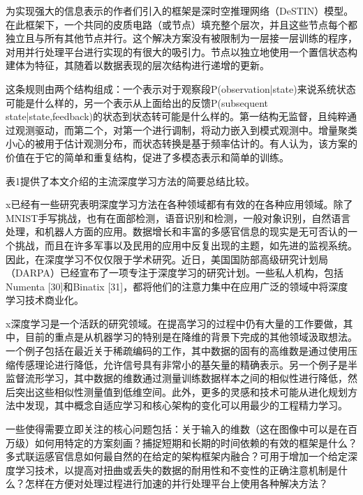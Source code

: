 为实现强大的信息表示的作者们引入的框架是深时空推理网络（DeSTIN）模型。在此框架下，一个共同的皮质电路（或节点）填充整个层次，并且这些节点每个都独立且与所有其他节点并行。这个解决方案没有被限制为一层接一层训练的程序，对用并行处理平台进行实现的有很大的吸引力。节点以独立地使用一个置信状态构建体为特征，其随着以数据表现的层次结构进行递增的更新。

这条规则由两个结构组成：一个表示对于观察段P(observation|state)来说系统状态可能是什么样的，另一个表示从上面给出的反馈P(subsequent state|state,feedback)的状态到状态转可能是什么样的。第一结构无监督，且纯粹通过观测驱动，而第二个，对第一个进行调制，将动力嵌入到模式观测中。增量聚类小心的被用于估计观测分布，而状态转换是基于频率估计的。有人认为，该方案的价值在于它的简单和重复结构，促进了多模态表示和简单的训练。

表1提供了本文介绍的主流深度学习方法的简要总结比较。

x已经有一些研究表明深度学习方法在各种领域都有有效的在各种应用领域。除了MNIST手写挑战，也有在面部检测，语音识别和检测，一般对象识别，自然语言处理，和机器人方面的应用。数据增长和丰富的多感官信息的现实是无可否认的一个挑战，而且在许多军事以及民用的应用中反复出现的主题，如先进的监视系统。因此，在深度学习不仅仅限于学术研究。近日，美国国防部高级研究计划局（DARPA）已经宣布了一项专注于深度学习的研究计划。一些私人机构，包括Numenta [30]和Binatix [31]，都将他们的注意力集中在应用广泛的领域中将深度学习技术商业化。

x深度学习是一个活跃的研究领域。在提高学习的过程中仍有大量的工作要做，其中，目前的重点是从机器学习的特别是在降维的背景下完成的其他领域汲取想法。一个例子包括在最近关于稀疏编码的工作，其中数据的固有的高维数是通过使用压缩传感理论进行降低，允许信号具有非常小的基矢量的精确表示。另一个例子是半监督流形学习，其中数据的维数通过测量训练数据样本之间的相似性进行降低，然后突出这些相似性测量值到低维空间。此外，更多的灵感和技术可能从进化规划方法中发现，其中概念自适应学习和核心架构的变化可以用最少的工程精力学习。

一些使得需要立即关注的核心问题包括：关于输入的维数（这在图像中可以是在百万级）如何用特定的方案刻画？捕捉短期和长期的时间依赖的有效的框架是什么？多式联运感官信息如何最自然的在给定的架构框架内融合？可用于增加一个给定深度学习技术，以提高对扭曲或丢失的数据的耐用性和不变性的正确注意机制是什么？怎样在方便对处理过程进行加速的并行处理平台上使用各种解决方法？

